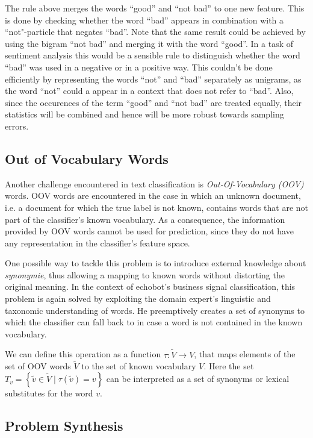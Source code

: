 The rule above merges the words ``good'' and ``not bad'' to one new feature.
This is done by checking whether the word ``bad'' appears in combination with a
``not"-particle that negates ``bad''. Note that the same result could be achieved
by using the bigram ``not bad'' and merging it with the word ``good''.
In a task of sentiment analysis this would be a sensible rule to
distinguish whether the word ``bad'' was used in a negative or in a positive
way. This couldn't be done efficiently by representing the words ``not''
and ``bad'' separately as unigrams, as the word ``not'' could a appear in a 
context that does not refer to ``bad''.
Also, since the occurences of the term ``good'' and ``not bad'' are treated
equally, their statistics will be combined and hence will be more robust towards
sampling errors.

\subsection{Out of Vocabulary Words}
\label{sec:problem-statement}

Another challenge encountered in text classification is \emph{Out-Of-Vocabulary (OOV)} 
words. OOV words are encountered in the case in which an unknown document, i.e.
a document for which the true label is not known,
contains words that are not part of the classifier's known vocabulary. 
As a consequence, the information provided by OOV words cannot be used for
prediction, since they do not have any representation in the classifier's feature 
space. 

One possible way to tackle this problem is to introduce external knowledge about
\textit{synonymie}, thus allowing a mapping to known words without distorting
the original meaning.
In the context of echobot's business signal classification, this problem is again 
solved by exploiting the domain expert's linguistic and taxonomic understanding
of words. He preemptively creates a set of synonyms to which the classifier can
fall back to in case a word is not contained in the known vocabulary.

We can define this operation as a function $\tau: \tilde{V} \to V$, that
maps elements of the set of OOV words $\tilde{V}$ to the set of known
vocabulary $V$. Here the set $T_v = \left\{ \tilde{v} \in \tilde{V} \mid
\tau(\tilde{v})=v \right\} $ can be interpreted as a set of synonyms or lexical
substitutes for the word $v$.


\subsection{Problem Synthesis}

